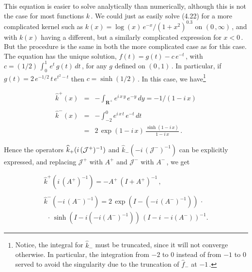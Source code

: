 \documentclass[11pt]{article}
\begin{document}
\begin{description}
 \noindent This equation is easier to solve analytically than
 numerically, although this is not the case for most functions $k$\,.
 We could just as easily solve (4.22) for a more complicated kernel
 such as $k(x) = \log(x)\,e^{- x}/(1+x^2)^{0.3}$ on $(0\,,\infty)$\,,
 and with $k(x)$ having a different, but a similarly complicated
 expression for $x < 0$\,.  But the procedure is the same in both the
 more complicated case as for this case.  The equation has the unique
 solution, $f(t) = g(t) - c\,e^{-t}$\,, with $c =
 (1/2)\,\int_0^1\,e^t\,g(t)\,dt$\,, for any $g$ defined on
 $(0\,,1)$\,.  In particular, if $g(t) = 2\,e^{-1/2}\,t\,e^{t^2 - t}$
 then $c = \sinh(1/2)$\,. In this case, we have\footnote{Notice, the
   integral for $\widehat{k}_-$ must be truncated, since it will not
   converge otherwise.  In particular, the integration from $-2$ to
   $0$ instead of from $-1$ to $0$ served to avoid the singularity due
   to the truncation of $\widehat{f}_-$ at $-1$\,.}

  \begin{equation} %
 \begin{array}{rcl}
 \widehat{k}^+(x) & = & - \displaystyle \int_{{\mathbf R}^+}  e^{i\,x\,y} \,
 e^{- y} \, dy = - 1/(1-i\,x) \\
 && \\
\widehat{k}^-(x) & = & - \displaystyle \int_{-2}^0 e^{i\,x\,t} \,
e^{-t} \, dt \\
& = & \displaystyle 2\,\exp(1 - i\,x) \, \frac{\sinh(1 - i\,x)}{1 - i\,x}\,.
 \end{array}
  \label{equation:4.28}
 \end{equation}

  \noindent Hence the operators $\widehat{k}_+(i\,({\cal J}^+)^{-1})$
  and $\widehat{k}_-(-i\,({\mathcal J}^-)^{-1})$ can be explicitly
  expressed, and replacing ${\mathcal J}^+$ with $A^+$ and ${\mathcal
    J}^-$ with $A^-$\,, we get

 \begin{equation} %
 \begin{array}{l}
 \widehat{k}^+(i\,(A^+)^{-1}) = - A^+\,(I + A^+)^{-1}\,, \\
  \\
  \widehat{k}^-(-i\,(A^-)^{-1}) = 2\,\exp\left(I -
  (-i\,(A^-)^{-1})\right)  \,\cdot \, \\
  \ \ \cdot \, \sinh\left(I
    - i(-i(A^-)^{-1})\right)\,\left(I - i\,-i(A^-)\right)^{-1} .
     \end{array}
 \label{equation:4.29}
  \end{equation}


\end{description}
\end{document}
